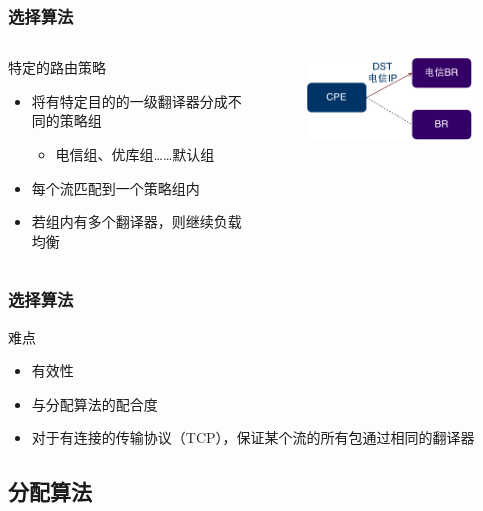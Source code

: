 \documentclass{beamer}
\begin{document}
\begin{frame}
  \frametitle{选择算法}
  \begin{columns}
    \begin{block}{特定的路由策略}
      \begin{itemize}
      \item 将有特定目的的一级翻译器分成不同的策略组
        \begin{itemize}
        \item 电信组、优库组……默认组
        \end{itemize}
      \item 每个流匹配到一个策略组内
      \item 若组内有多个翻译器，则继续负载均衡
      \end{itemize}
    \end{block}
    \begin{figure}[ht]
      \begin{center}
        \includegraphics[width=15em]{figs/BR-selection-policy.pdf}  
      \end{center}
    \end{figure}
  \end{columns}
\end{frame}

\begin{frame}
  \frametitle{选择算法}
  \begin{block}{难点}
    \begin{itemize}
    \item 有效性
    \item 与分配算法的配合度
    \item 对于有连接的传输协议（TCP），保证某个流的所有包通过相同的翻译器
    \end{itemize}
  \end{block}
\end{frame}

\subsection{分配算法}
\end{document}
